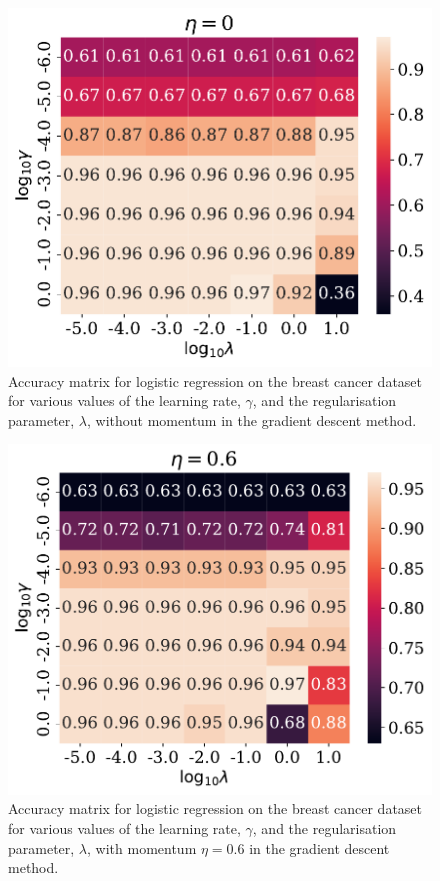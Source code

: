 \documentclass[a4paper, 
amsfonts, 
amssymb, 
amsmath, 
reprint, 
showkeys, 
nofootinbib, 
twoside]{revtex4-2}
\begin{document}
\begin{figure}
    \centering
    \includegraphics[width = \columnwidth]{Figures/logreg_no_mom.pdf}
    \caption{Accuracy matrix for logistic regression on the breast cancer dataset for various values of the learning rate, $\gamma$, and the regularisation parameter, $\lambda$, without momentum in the gradient descent method.}
    \label{fig:logreg1}
\end{figure}

\begin{figure}
    \centering
    \includegraphics[width = \columnwidth]{Figures/logreg_mom.pdf}
    \caption{Accuracy matrix for logistic regression on the breast cancer dataset for various values of the learning rate, $\gamma$, and the regularisation parameter, $\lambda$, with momentum $\eta = 0.6$ in the gradient descent method.}
    \label{fig:logreg2}
\end{figure}
\end{document}
